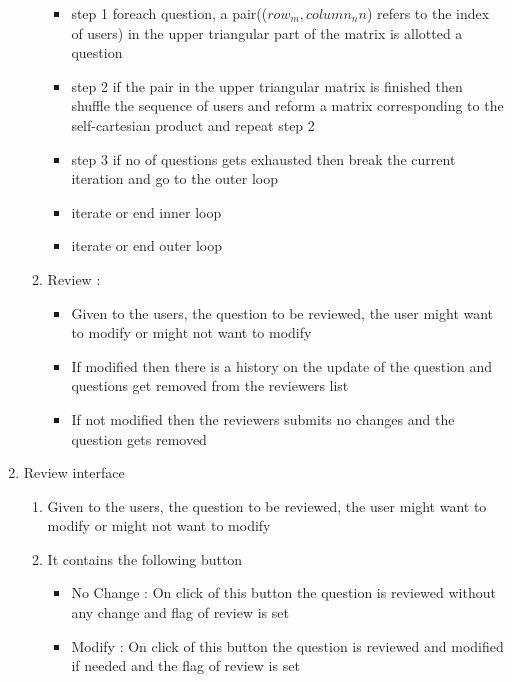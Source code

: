 \documentclass[a4paper,12pt,oneside]{book}
\begin{document}
\begin{enumerate}
\begin{enumerate}
\begin{itemize}
                    \item  step 1 foreach question, a pair((\(row_{m} , column_n{n}\)) refers to the index of users) in the upper triangular part of the matrix is allotted a question
                    \item  step 2 if the pair in the upper triangular matrix is finished then shuffle the sequence of users and reform a matrix corresponding to the self-cartesian product and repeat step 2
                    \item  step 3 if no of questions gets exhausted then break the current iteration and go to the outer loop
                    \item iterate or end inner loop
                    \item iterate or end outer loop
                \end{itemize}
            \item Review :
                \begin{itemize}
                    \item Given to the users, the question  to be reviewed, the user might want to modify or might not want to modify
                    \item If modified then there is a history on the update of the question and questions get removed from the reviewers list
                    \item  If not modified then the reviewers submits no changes and the question gets removed
                \end{itemize}

            \end{enumerate}

        \vspace{1in}
        \item Review interface
            \begin{enumerate}
            \item Given to the users, the question  to be reviewed, the user might want to modify or might not want to modify
            \item It contains the following button
                            \begin{itemize}
                                \item  No Change : On click of this button the question is reviewed without any change and flag of review is set
                                \item  Modify : On click of this button the
                                question is reviewed and modified if needed and the flag of review is set
                            \end{itemize}
            \end{enumerate}
            

\end{enumerate}
\end{document}
